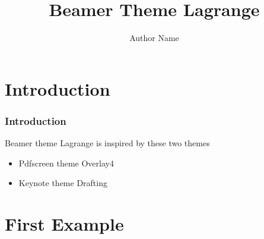 \documentclass[11pt,xcolor={rgb}]{beamer}
\begin{document}
\title{Beamer Theme Lagrange}
\author{Author Name}

\begin{frame}[plain]
\titlepage
\end{frame}

\section{Introduction}

\begin{frame}
\frametitle{Introduction}
Beamer theme Lagrange is inspired by these two themes
\begin{itemize}
  \item Pdfscreen theme Overlay4
  \item Keynote theme Drafting
\end{itemize}
\end{frame}

\section{First Example}

\end{document}
